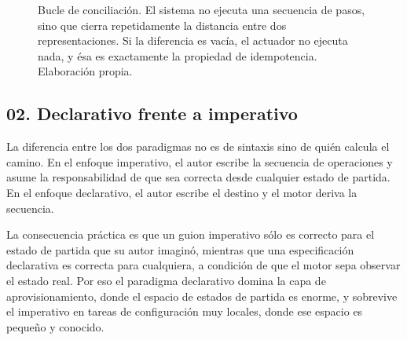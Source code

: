 \documentclass[11pt,letterpaper]{article}
\begin{document}
\begin{figure}[ht]
  \centering
  \caption{Bucle de conciliación. El sistema no ejecuta una secuencia de
  pasos, sino que cierra repetidamente la distancia entre dos
  representaciones. Si la diferencia es vacía, el actuador no ejecuta nada, y
  ésa es exactamente la propiedad de idempotencia. Elaboración propia.}
  \label{fig:bucle}
\end{figure}

\subsection*{02. Declarativo frente a imperativo}

La diferencia entre los dos paradigmas no es de sintaxis sino de quién calcula
el camino. En el enfoque imperativo, el autor escribe la secuencia de
operaciones y asume la responsabilidad de que sea correcta desde cualquier
estado de partida. En el enfoque declarativo, el autor escribe el destino y el
motor deriva la secuencia.

La consecuencia práctica es que un guion imperativo sólo es correcto para el
estado de partida que su autor imaginó, mientras que una especificación
declarativa es correcta para cualquiera, a condición de que el motor sepa
observar el estado real. Por eso el paradigma declarativo domina la capa de
aprovisionamiento, donde el espacio de estados de partida es enorme, y
sobrevive el imperativo en tareas de configuración muy locales, donde ese
espacio es pequeño y conocido.
\end{document}
